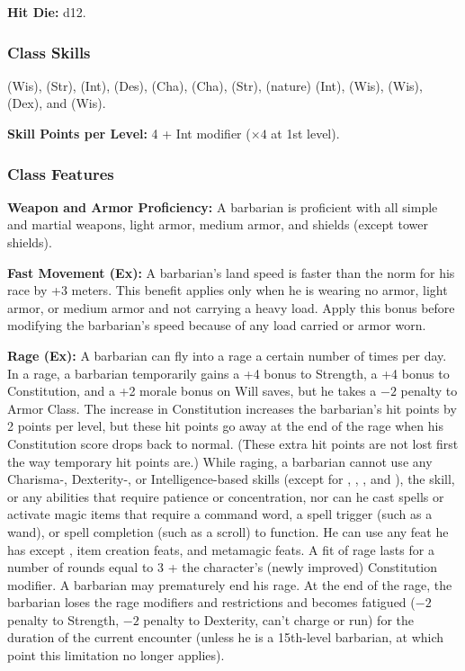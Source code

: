 \textbf{Hit Die:} d12.

\subsubsection{Class Skills}
 (Wis),  (Str),  (Int),  (Des),  (Cha),  (Cha),  (Str),  (nature) (Int),  (Wis),  (Wis),  (Dex), and  (Wis).

\textbf{Skill Points per Level:} 4 + Int modifier ($\times4$ at 1st level).

\subsubsection{Class Features}
\textbf{Weapon and Armor Proficiency:} A barbarian is proficient with all simple and martial weapons, light armor, medium armor, and shields (except tower shields).

\textbf{Fast Movement (Ex):} A barbarian's land speed is faster than the norm for his race by +3 meters. This benefit applies only when he is wearing no armor, light armor, or medium armor and not carrying a heavy load. Apply this bonus before modifying the barbarian's speed because of any load carried or armor worn.

\textbf{Rage (Ex):} A barbarian can fly into a rage a certain number of times per day. In a rage, a barbarian temporarily gains a +4 bonus to Strength, a +4 bonus to Constitution, and a +2 morale bonus on Will saves, but he takes a $-2$ penalty to Armor Class. The increase in Constitution increases the barbarian's hit points by 2 points per level, but these hit points go away at the end of the rage when his Constitution  score drops back to normal. (These extra hit points are not lost first the way temporary hit points are.) While raging, a barbarian cannot use any Charisma-, Dexterity-, or Intelligence-based skills (except for , , , and ), the  skill, or any abilities that require patience or concentration, nor can he cast spells or activate magic items that require a command word, a spell trigger (such as a wand), or spell completion (such as a scroll) to function. He can use any feat he has except , item creation feats, and metamagic feats. A fit of rage lasts for a number of rounds equal to 3 + the character's (newly improved) Constitution modifier. A barbarian may prematurely end his rage. At the end of the rage, the barbarian loses the rage modifiers and restrictions and becomes fatigued ($-2$ penalty to Strength, $-2$ penalty to Dexterity, can't charge or run) for the duration of the current encounter (unless he is a 15th-level barbarian, at which point this limitation no longer applies).

